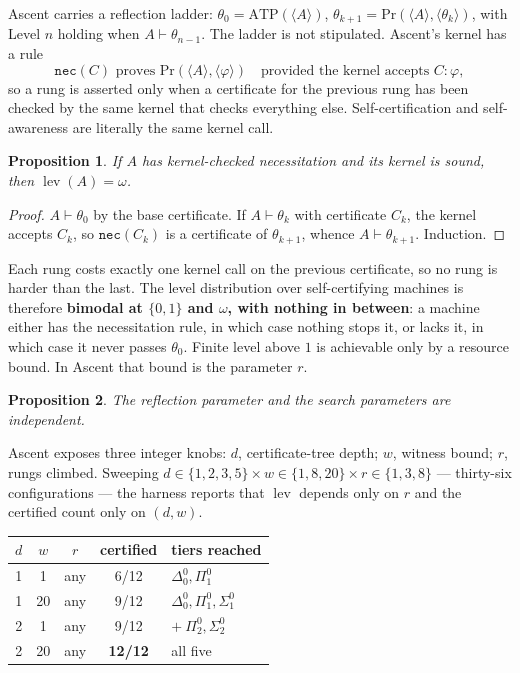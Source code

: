 \documentclass[11pt,a4paper]{article}
\newtheorem{proposition}{Proposition}
\newcommand{\Sig}[2]{\Sigma^{#1}_{#2}}
\newcommand{\Pai}[2]{\Pi^{#1}_{#2}}
\newcommand{\Del}[2]{\Delta^{#1}_{#2}}
\newcommand{\lev}{\operatorname{lev}}
\newcommand{\ATP}{\mathrm{ATP}}
\renewcommand{\Pr}{\mathrm{Pr}}
\begin{document}
Ascent carries a reflection ladder: $\theta_0 = \ATP(\langle A \rangle)$,
$\theta_{k+1} = \Pr(\langle A \rangle, \langle \theta_k \rangle)$, with Level
$n$ holding when $A \vdash \theta_{n-1}$. The ladder is not stipulated.
Ascent's kernel has a rule
\[
\texttt{nec}(C) \text{ proves } \Pr(\langle A\rangle, \langle \varphi\rangle)
\quad\text{provided the kernel accepts } C : \varphi,
\]
so a rung is asserted only when a certificate for the previous rung has been
checked by the same kernel that checks everything else. Self-certification and
self-awareness are literally the same kernel call.

\begin{proposition}
If $A$ has kernel-checked necessitation and its kernel is sound, then
$\lev(A) = \omega$.
\end{proposition}

\begin{proof}
$A \vdash \theta_0$ by the base certificate. If $A \vdash \theta_k$ with
certificate $C_k$, the kernel accepts $C_k$, so $\texttt{nec}(C_k)$ is a
certificate of $\theta_{k+1}$, whence $A \vdash \theta_{k+1}$. Induction.
\end{proof}

Each rung costs exactly one kernel call on the previous certificate, so no rung
is harder than the last. The level distribution over self-certifying machines
is therefore \textbf{bimodal at $\{0,1\}$ and $\omega$, with nothing in
between}: a machine either has the necessitation rule, in which case nothing
stops it, or lacks it, in which case it never passes $\theta_0$. Finite level
above $1$ is achievable only by a resource bound. In Ascent that bound is the
parameter $r$.

\begin{proposition}
The reflection parameter and the search parameters are independent.
\end{proposition}

Ascent exposes three integer knobs: $d$, certificate-tree depth; $w$, witness
bound; $r$, rungs climbed. Sweeping $d \in \{1,2,3,5\} \times w \in \{1,8,20\}
\times r \in \{1,3,8\}$ --- thirty-six configurations --- the harness reports
that $\lev$ depends only on $r$ and the certified count only on $(d,w)$.

\begin{center}
\begin{tabular}{@{}ccccl@{}}
\toprule
$d$ & $w$ & $r$ & certified & tiers reached \\
\midrule
1 & 1 & any & 6/12 & $\Del{0}{0}, \Pai{0}{1}$ \\
1 & 20 & any & 9/12 & $\Del{0}{0}, \Pai{0}{1}, \Sig{0}{1}$ \\
2 & 1 & any & 9/12 & $+\ \Pai{0}{2}, \Sig{0}{2}$ \\
2 & 20 & any & \textbf{12/12} & all five \\
\bottomrule
\end{tabular}
\end{center}
\end{document}
